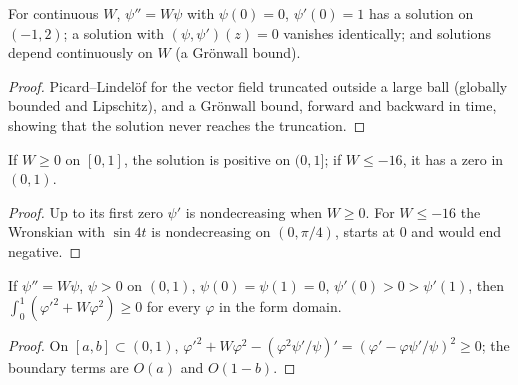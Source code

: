 \begin{lemma}
  \label{lem:box_solve}
  \leanok
  For continuous $W$, $\psi''=W\psi$ with $\psi(0)=0$, $\psi'(0)=1$ has a solution on $(-1,2)$; a solution with
  $(\psi,\psi')(z)=0$ vanishes identically; and solutions depend continuously on $W$ (a Gr\"onwall bound).
\end{lemma}
\begin{proof}
  \leanok
  Picard--Lindel\"of for the vector field truncated outside a large ball (globally bounded and Lipschitz), and a
  Gr\"onwall bound, forward and backward in time, showing that the solution never reaches the truncation.
\end{proof}

\begin{lemma}[Comparison]
  \label{lem:box_sturm}
  \leanok
  If $W\ge0$ on $[0,1]$, the solution is positive on $(0,1]$; if $W\le-16$, it has a zero in $(0,1)$.
\end{lemma}
\begin{proof}
  \leanok
  Up to its first zero $\psi'$ is nondecreasing when $W\ge0$. For $W\le-16$ the Wronskian with $\sin4t$ is
  nondecreasing on $(0,\pi/4)$, starts at $0$ and would end negative.
\end{proof}

\begin{lemma}
  \label{lem:box_picone}
  \leanok
  If $\psi''=W\psi$, $\psi>0$ on $(0,1)$, $\psi(0)=\psi(1)=0$, $\psi'(0)>0>\psi'(1)$, then
  $\int_0^1(\varphi'^2+W\varphi^2)\ge0$ for every $\varphi$ in the form domain.
\end{lemma}
\begin{proof}
  \leanok
  On $[a,b]\subset(0,1)$, $\varphi'^2+W\varphi^2-(\varphi^2\psi'/\psi)'=(\varphi'-\varphi\psi'/\psi)^2\ge0$; the
  boundary terms are $O(a)$ and $O(1-b)$.
\end{proof}

